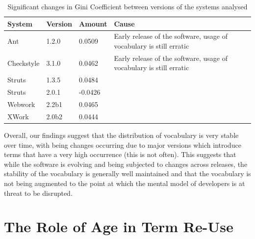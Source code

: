 % 
% 
% 
% 
% 
% 
% 

\begin{table}[t]
\centering
\begin{tabular}{|p{}|p{}|p{}|p{}|}
\hline
{\bf System} & {\bf Version} & {\bf Amount} & {\bf Cause}\\
\hline
\hline
Ant
&
1.2.0
&
0.0509
&
Early release of the software, usage of vocabulary is still erratic
\\
\hline
Checkstyle
&
3.1.0
&
0.0462
&
Early release of the software, usage of vocabulary is still erratic
\\
\hline
Struts
&
1.3.5
&
0.0484
&
\\
\hline
Struts
&
2.0.1
&
-0.0426
&
\\
\hline
Webwork
&
2.2b1
&
0.0465
&
\\
\hline
XWork
&
2.0b2
&
0.0444
&
\\
\hline
\end{tabular}
\vspace{0.2cm}
\caption{Significant changes in Gini Coefficient between versions of the systems analysed}
\label{tab:vocab_growth_rate_implications}
\vspace{-0.2cm}
\end{table}

Overall, our findings suggest that the distribution of vocabulary is very stable over time, with being changes occurring due to major versions which introduce terms that have a very high occurrence (this is not often). This suggests that while the software is evolving and being subjected to changes across releases, the stability of the vocabulary is generally well maintained and that the vocabulary is not being augmented to the point at which the mental model of developers is at threat to be disrupted.



\section{The Role of Age in Term Re-Use} %
\label{sec:the_role_of_age_in_term_re_use}

